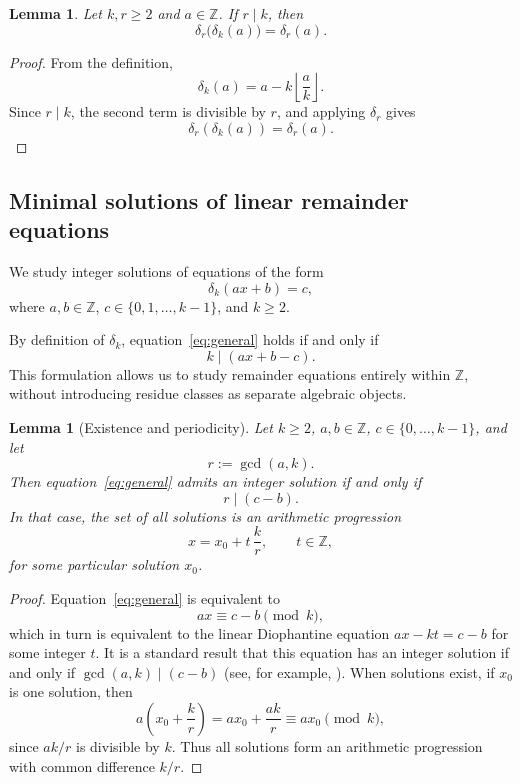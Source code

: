 \documentclass[12pt]{article}
\newtheorem{lemma}[theorem]{Lemma}
\begin{document}
\begin{lemma}\label{lem:conmuta1}
Let $k,r \ge 2$ and $a \in \mathbb{Z}$. If $r \mid k$, then
\[
\delta_r\bigl(\delta_k(a)\bigr) = \delta_r(a).
\]
\end{lemma}

\begin{proof}
From the definition,
\[
\delta_k(a)
=
a - k \left\lfloor \frac{a}{k} \right\rfloor.
\]
Since $r \mid k$, the second term is divisible by $r$, and applying 
$\delta_r$ gives
\[
\delta_r(\delta_k(a))
=
\delta_r(a).
\]
\end{proof}



\subsection{Minimal solutions of linear remainder equations}
\label{subsec:minimal}

We study integer solutions of equations of the form
\begin{equation}\label{eq:general}
\delta_k(ax+b) = c,
\end{equation}
where $a,b \in \mathbb{Z}$, $c \in \{0,1,\dots,k-1\}$, and $k \ge 2$.

By definition of $\delta_k$, equation~\eqref{eq:general} holds if and only if
\[
k \mid (ax+b-c).
\]
This formulation allows us to study remainder equations entirely within $\mathbb{Z}$,
without introducing residue classes as separate algebraic objects.

\begin{lemma}[Existence and periodicity]\label{lema:criterio_funcional}
Let $k \ge 2$, $a,b \in \mathbb{Z}$, $c \in \{0,\dots,k-1\}$, and let
\[
r := \gcd(a,k).
\]
Then equation~\eqref{eq:general} admits an integer solution if and only if
\[
r \mid (c-b).
\]
In that case, the set of all solutions is an arithmetic progression
\[
x = x_0 + t\,\frac{k}{r}, \qquad t \in \mathbb{Z},
\]
for some particular solution $x_0$.
\end{lemma}

\begin{proof}
Equation~\eqref{eq:general} is equivalent to
\[
ax \equiv c-b \pmod{k},
\]
which in turn is equivalent to the linear Diophantine equation
$ax - kt = c-b$ for some integer $t$.
It is a standard result that this equation has an integer solution if and only
if $\gcd(a,k) \mid (c-b)$ (see, for example, \cite{HardyWright2008}).
When solutions exist, if $x_0$ is one solution, then
\[
a\!\left(x_0 + \frac{k}{r}\right) = ax_0 + \frac{ak}{r} \equiv ax_0 \pmod{k},
\]
since $ak/r$ is divisible by $k$. Thus all solutions form an arithmetic
progression with common difference $k/r$.
\end{proof}
\end{document}
